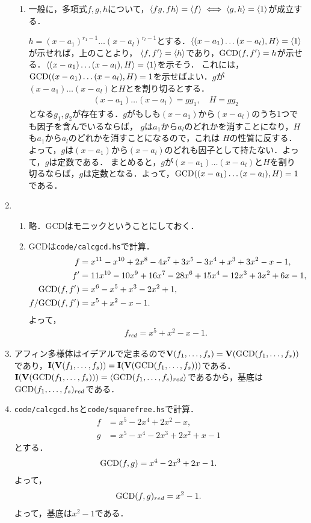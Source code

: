 \documentclass[9pt]{ltjsarticle}
\theoremstyle{break}
\theoremstyle{break}
\theoremstyle{break}
\theoremstyle{break}
\theoremstyle{break}
\theoremstyle{break}
\theoremstyle{break}
\theoremstyle{break}
\theoremstyle{break}
\theoremstyle{break}
\theoremstyle{break}
\theoremstyle{break}
\theoremstyle{break}
\theoremstyle{break}
\theoremstyle{break}
\theoremstyle{nonumberbreak}
\theoremstyle{nonumberbreak}
\begin{document}
\begin{enumerate}[label=(問題\arabic*)]
\begin{enumerate}[label=(\alph*)]
 \item {}
一般に，多項式$f,g,h$について，$\langle fg,fh \rangle=\langle f \rangle \iff \langle g,h \rangle = \langle 1 \rangle$が成立する．

$h=(x-a_1)^{r_1-1}\dots (x-a_l)^{r_l-1}$とする．$\langle (x-a_1)\dots (x-a_l),H \rangle=\langle 1 \rangle$が示せれば，上のことより，
$\langle f,f' \rangle=\langle h \rangle$であり，${\rm GCD}(f,f')=h$が示せる．$\langle (x-a_1)\dots (x-a_l),H \rangle=\langle 1 \rangle$を示そう．
これには，${\rm GCD}((x-a_1)\dots (x-a_l),H)=1$を示せばよい．$g$が$(x-a_1)\dots(x-a_l)$と$H$とを割り切るとする．
\begin{align}
 (x-a_1)\dots (x-a_l) = gg_1,\quad H = gg_2
\end{align}
となる$g_1,g_2$が存在する．$g$がもしも$(x-a_1)$から$(x-a_l)$のうち1つでも因子を含んでいるならば，
$g$は$a_1$から$a_l$のどれかを消すことになり，$H$も$a_1$から$a_l$のどれかを消すことになるので，これは
$H$の性質に反する．よって，$g$は$(x-a_1)$から$(x-a_l)$のどれも因子として持たない．よって，$g$は定数である．
まとめると，$g$が$(x-a_1)\dots(x-a_l)$と$H$を割り切るならば，$g$は定数となる．よって，${\rm GCD}((x-a_1)\dots (x-a_l),H)=1$である．
\end{enumerate}

 \item
\begin{enumerate}[label=(\alph*)]
 \item 略．GCDはモニックということにしておく．
 \item  GCDは{\tt code/calcgcd.hs}で計算．
\begin{align}
 f&= x^{11} - x^{10} +2x^8 -4x^7 +3x^5 -3x^4+x^3 +3x^2 -x-1,\\
 f'& = 11x^{10} - 10x^9 + 16x^7 - 28x^6 + 15x^4 -12x^3 + 3x^2 + 6x -1,\\
 {\rm GCD}(f,f')& = x^6 -x^5 +x^3 -2x^2 + 1,\\
 f/{\rm GCD}(f,f')& = x^5 + x^2 -x -1.
\end{align}
よって，
\begin{align}
 f_{red} = x^5 + x^2 -x -1.
\end{align}
\end{enumerate}
 \item アフィン多様体はイデアルで定まるので$\textbf V(f_1,\dots,f_s)=\textbf V({\rm GCD}(f_1,\dots,f_s))$であり，$\textbf I(\textbf V(f_1,\dots,f_s))=\textbf I(\textbf V({\rm GCD}(f_1,\dots,f_s)))$である．$\textbf I(\textbf V({\rm GCD}(f_1,\dots,f_s)))=\langle {\rm GCD}(f_1,\dots,f_s)_{red} \rangle$であるから，基底は${\rm GCD}(f_1,\dots,f_s)_{red}$である．
 \item {\tt code/calcgcd.hs}と{\tt code/squarefree.hs}で計算．
\begin{align}
 f &= x^5-2x^4+2x^2-x,\\
 g& = x^5-x^4-2x^3+2x^2+x-1
\end{align}
とする．
\begin{align}
 {\rm GCD}(f,g) = x^4 -2x^3 + 2x -1.
\end{align}
よって，
\begin{align}
 {\rm GCD}(f,g)_{red} = x^2 - 1.
\end{align}
よって，基底は$x^2-1$である．
\end{enumerate}
\end{document}
